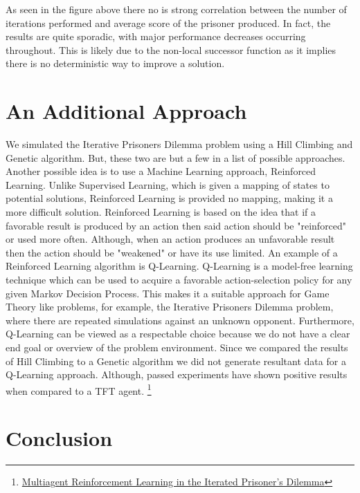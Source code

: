 \documentclass[12pt]{article}
\begin{document}
As seen in the figure above there no is strong correlation between the number
of iterations performed and average score of the prisoner produced.  In fact, the results
are quite sporadic, with major performance decreases occurring throughout.  This is
likely due to the non-local successor function as it implies there is no deterministic way
to improve a solution.

\pagebreak

\section{An Additional Approach}

We simulated the Iterative Prisoners Dilemma problem using a Hill Climbing and Genetic algorithm. But, these two are but a few in a list of possible approaches. Another possible idea is to use a Machine Learning approach, Reinforced Learning. Unlike Supervised Learning, which is given a mapping of states to potential solutions, Reinforced Learning is provided no mapping, making it a more difficult solution. Reinforced Learning is based on the idea that if a favorable result is produced by an action then said action should be "reinforced" or used more often. Although, when an action produces an unfavorable result then the action should be "weakened" or have its use limited. An example of a Reinforced Learning algorithm is Q-Learning. Q-Learning is a model-free learning technique which can be used to acquire a favorable action-selection policy for any given Markov Decision Process. This makes it a suitable approach for Game Theory like problems, for example, the Iterative Prisoners Dilemma problem, where there are repeated simulations against an unknown opponent. Furthermore, Q-Learning can be viewed as a respectable choice because we do not have a clear end goal or overview of the problem environment. Since we compared the results of Hill Climbing to a Genetic algorithm we did not generate resultant data for a Q-Learning approach. Although, passed experiments have shown positive results when compared to a TFT agent. \footnote{\href{http://www.agent.ai/doc/upload/200302/sand95_5.pdf}
{Multiagent Reinforcement Learning in the Iterated Prisoner's Dilemma}}

\pagebreak

\section{Conclusion}
\end{document}
